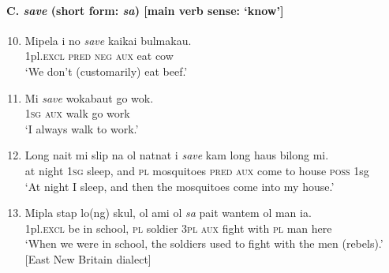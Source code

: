 {\paragraph*{C. \textit{save} (short form: \textit{sa})  [main verb sense: ‘know’]}
\begin{enumerate} \setcounter{enumi}{9} 
\item   
\gll Mipela  i  no  \textit{save}  kaikai  bulmakau.\\
1pl.\textsc{excl}  \textsc{pred}  \textsc{neg}  \textsc{aux}  eat  cow\\
\glt ‘We don’t (customarily) eat beef.’  
\item  
\gll Mi  \textit{save}  wokabaut  go  wok.\\
\textsc{1sg}  \textsc{aux}  walk  go  work\\
\glt ‘I always walk to work.’ 
\item  
\gll  Long  nait  mi  slip  na  ol  natnat  i  \textit{save}  kam  long  haus  bilong  mi.\\
at  night  \textsc{1sg}  sleep,  and  \textsc{pl}  mosquitoes  \textsc{pred}  \textsc{aux}  come  to  house  \textsc{poss}  1sg\\
\glt ‘At night I sleep, and then the mosquitoes come into my house.’  
\item   
\gll Mipla  stap  lo(ng)  skul,  ol  ami  ol  \textit{sa}  pait  wantem  ol  man  ia.\\
1pl.\textsc{excl}  be  in  school,  \textsc{pl}  soldier  3\textsc{pl}  \textsc{aux}  fight  with  \textsc{pl}  man  here\\
\glt ‘When we were in school, the soldiers used to fight with the men (rebels).’ [East New Britain dialect]

\end{enumerate}

}
